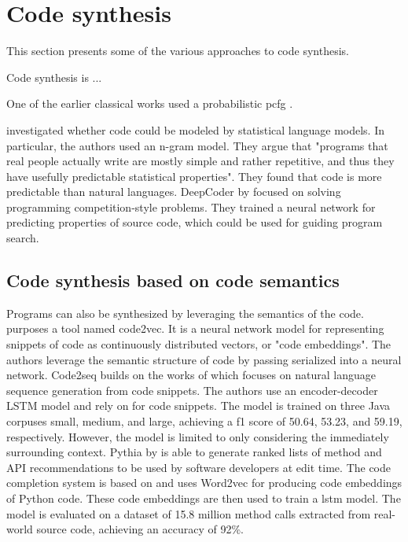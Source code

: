\section{Code synthesis}

This section presents some of the various approaches to code synthesis. 

Code synthesis is ... 

One of the earlier classical works used a probabilistic \acrfull{pcfg} \cite{allamanis2015bimodal}.

\textcite{hindle2012natural} investigated whether code could be modeled by statistical language models. In particular, the authors used an n-gram model. They argue that "programs that real people actually write are mostly simple and rather repetitive, and thus they have usefully predictable statistical properties". They found that code is more predictable than natural languages. DeepCoder by \textcite{balog2017deepcoder} focused on solving programming competition-style problems. They trained a neural network for predicting properties of source code, which could be used for guiding program search.

\subsection{Code synthesis based on code semantics}
Programs can also be synthesized by leveraging the semantics of the code. \textcite{alon2018code2vec} purposes a tool named code2vec. It is a neural network model for representing snippets of code as continuously distributed vectors, or "code embeddings". The authors leverage the semantic structure of code by passing serialized  into a neural network. Code2seq \cite{alon2018code2seq} builds on the works of \textcite{alon2018code2vec} which focuses on natural language sequence generation from code snippets. The authors use an encoder-decoder LSTM model and rely on  for code snippets. The model is trained on three Java corpuses small, medium, and large, achieving a \gls{f1} score of 50.64, 53.23, and 59.19, respectively. However, the model is limited to only considering the immediately surrounding context. Pythia by \textcite{svyatkovskiy2019pyhia} is able to generate ranked lists of method and API recommendations to be used by software developers at edit time. The code completion system is based on  and uses Word2vec for producing code embeddings of Python code. These code embeddings are then used to train a \gls{lstm} model. The model is evaluated on a dataset of 15.8 million method calls extracted from real-world source code, achieving an accuracy of 92\%.

